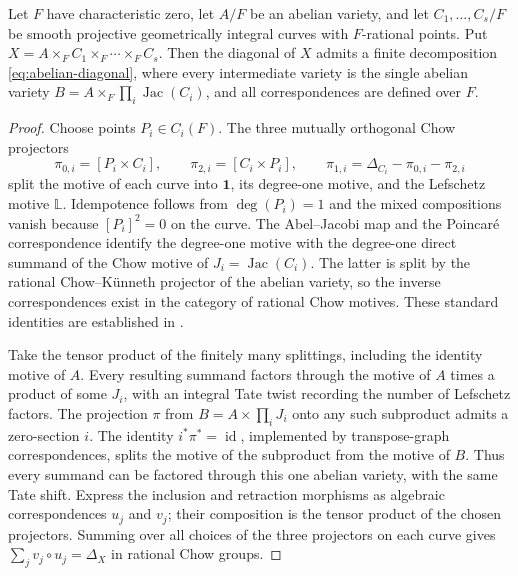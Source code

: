 \begin{lemma}
\label{lem:curve-product-diagonal}
Let $F$ have characteristic zero, let $A/F$ be an abelian variety,
and let $C_1,\ldots,C_s/F$ be smooth projective geometrically
integral curves with $F$-rational points.  Put
$X=A\times_F C_1\times_F\cdots\times_F C_s$.
Then the diagonal of $X$ admits a finite decomposition
\eqref{eq:abelian-diagonal}, where every intermediate variety
is the single abelian variety
$B=A\times_F\prod_i\operatorname{Jac}(C_i)$,
and all correspondences are defined over $F$.
\end{lemma}

\begin{proof}
Choose points $P_i\in C_i(F)$.  The three mutually orthogonal
Chow projectors
\[
 \pi_{0,i}=[P_i\times C_i],\qquad
 \pi_{2,i}=[C_i\times P_i],\qquad
 \pi_{1,i}=\Delta_{C_i}-\pi_{0,i}-\pi_{2,i}
\]
split the motive of each curve into $\mathbf 1$, its
degree-one motive, and the Lefschetz motive $\mathbb L$.
Idempotence follows from $\deg(P_i)=1$ and the mixed
compositions vanish because $[P_i]^2=0$ on the curve.
The Abel--Jacobi map and the Poincar\'e correspondence identify
the degree-one motive with the degree-one direct summand of
the Chow motive of $J_i=\operatorname{Jac}(C_i)$.  The latter
is split by the rational Chow--K\"unneth projector of the
abelian variety, so the inverse correspondences exist in the
category of rational Chow motives.  These standard identities
are established in \cite[Sections~3 and~5]{Scholl}.

Take the tensor product of the finitely many splittings, including
the identity motive of $A$.  Every resulting summand factors
through the motive of $A$ times a product of some $J_i$, with
an integral Tate twist recording the number of Lefschetz factors.
The projection $\pi$ from $B=A\times\prod_i J_i$ onto any such
subproduct admits a zero-section $i$.  The identity
$i^*\pi^*=\operatorname{id}$, implemented by transpose-graph
correspondences, splits the motive of the subproduct from
the motive of $B$.  Thus every summand can be
factored through this one abelian variety, with the same Tate
shift.
Express the inclusion and retraction morphisms as algebraic
correspondences $u_j$ and $v_j$; their composition is the tensor
product of the chosen projectors.  Summing over all choices of
the three projectors on each curve gives
$\sum_jv_j\circ u_j=\Delta_X$ in rational Chow groups.
\end{proof}

